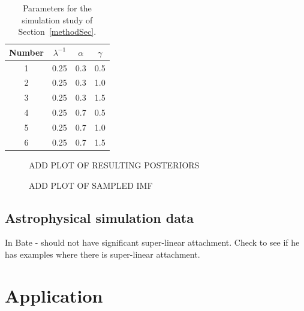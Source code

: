 \documentclass[12pt]{article}
\begin{document}
\begin{table}[htbp]
   \centering
   \begin{tabular}{|c|c|c|c|} %
   \hline
   Number & $\lambda^{-1}$ & $\alpha$ & $\gamma$\\
   \hline
1	&	0.25	&	0.3	&	0.5	\\
2	&	0.25	&	0.3	&	1.0	\\
3	&	0.25	&	0.3	&	1.5	\\
4	&	0.25	&	0.7	&	0.5	\\
5	&	0.25	&	0.7	&	1.0	\\
6	&	0.25	&	0.7	&	1.5	\\
\hline
   \end{tabular}
   \caption{Parameters for the simulation study of Section~\ref{methodSec}.}
   \label{tab:sim_study}
\end{table}


\begin{figure}[htbp]
   \centering
   \caption{ADD PLOT OF RESULTING POSTERIORS}
   \label{fig:abc_pa_posterior}
\end{figure}




\begin{figure}[htbp]
   \centering
   \caption{ADD PLOT OF SAMPLED IMF}
   \label{fig:abc_pa_imf}
\end{figure}



\subsection{Astrophysical simulation data}

\cite{Bate2012}

In Bate - should not have significant super-linear attachment.  Check to see if he has examples where there is super-linear attachment.




\section{Application}
\label{sec:orion}
\end{document}
